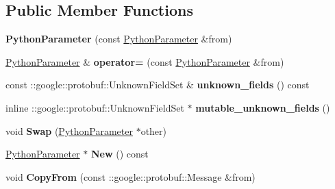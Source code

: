 \subsection*{Public Member Functions}
\begin{DoxyCompactItemize}
\item 
\mbox{\label{classcaffe_1_1_python_parameter_acaba4307a226f540b29b56ba96352827}} 
{\bfseries Python\+Parameter} (const \mbox{\hyperlink{classcaffe_1_1_python_parameter}{Python\+Parameter}} \&from)
\item 
\mbox{\label{classcaffe_1_1_python_parameter_a7f1bb2458e725ab420754346d1864297}} 
\mbox{\hyperlink{classcaffe_1_1_python_parameter}{Python\+Parameter}} \& {\bfseries operator=} (const \mbox{\hyperlink{classcaffe_1_1_python_parameter}{Python\+Parameter}} \&from)
\item 
\mbox{\label{classcaffe_1_1_python_parameter_aae1915aef88f7c6ff8c0b8674869867e}} 
const \+::google\+::protobuf\+::\+Unknown\+Field\+Set \& {\bfseries unknown\+\_\+fields} () const
\item 
\mbox{\label{classcaffe_1_1_python_parameter_a1c6c59aded85088b1cafdb418c6add8b}} 
inline \+::google\+::protobuf\+::\+Unknown\+Field\+Set $\ast$ {\bfseries mutable\+\_\+unknown\+\_\+fields} ()
\item 
\mbox{\label{classcaffe_1_1_python_parameter_ad2fe3ef821200117e4211206ccb586b5}} 
void {\bfseries Swap} (\mbox{\hyperlink{classcaffe_1_1_python_parameter}{Python\+Parameter}} $\ast$other)
\item 
\mbox{\label{classcaffe_1_1_python_parameter_a5064d581d2ee8403076f9a60761c3e8d}} 
\mbox{\hyperlink{classcaffe_1_1_python_parameter}{Python\+Parameter}} $\ast$ {\bfseries New} () const
\item 
\mbox{\label{classcaffe_1_1_python_parameter_a178a54a47c4bb365928c752997836054}} 
void {\bfseries Copy\+From} (const \+::google\+::protobuf\+::\+Message \&from)
\item 
\mbox{\label{classcaffe_1_1_python_parameter_a62968e5e21a6f81bf03c50832851d42b}} 

\end{DoxyCompactItemize}
